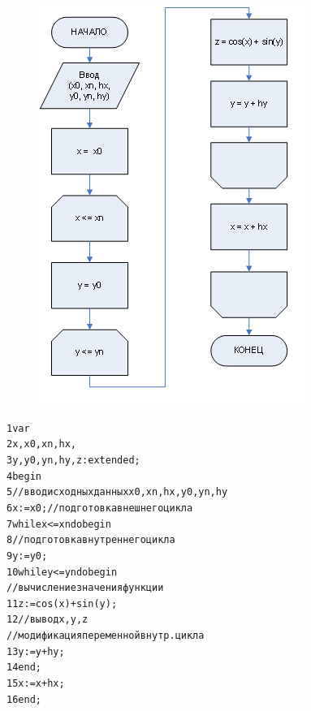 \documentclass{beamer}
\begin{document}
\begin{frame}[fragile]
\begin{figure}[h]
\includegraphics[scale=0.6]{images/lec04-pic13.png}
\end{figure}
\end{frame}

\begin{frame}[fragile]
\begin{alltt}
1 var  
2  x, x0, xn, hx, 
3  y, y0, yn, hy, z: extended;
4 begin 
5 //ввод исходных данных x0, xn, hx, y0, yn, hy
6  x := x0; // подготовка внешнего цикла
7  while x <= xn do begin
8 // подготовка внутреннего цикла
9    y := y0;
10   while y <= yn do begin
       // вычисление значения функции
11     z := cos(x) + sin(y);
12     // вывод x, y, z
       // модификация переменной внутр. цикла
13     y := y + hy;
14   end;
15   x := x + hx;
16 end;
\end{alltt}
\end{frame}
\end{document}
